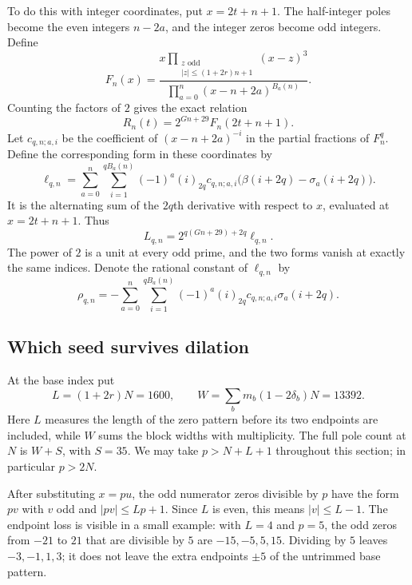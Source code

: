 \documentclass[11pt]{article}
\begin{document}
To do this with integer coordinates, put $x=2t+n+1$. The half-integer
poles become the even integers $n-2a$, and the integer zeros become odd
integers. Define
\begin{equation}\label{eq:F}
 F_n(x)=\frac{x\prod_{\substack{z\text{ odd}\\|z|\le(1+2r)n+1}}(x-z)^3}
 {\prod_{a=0}^n(x-n+2a)^{B_a(n)}}.
\end{equation}
Counting the factors of $2$ gives the exact relation
\begin{equation}\label{eq:change}
 R_n(t)=2^{Gn+29}F_n(2t+n+1).
\end{equation}
Let $c_{q,n;a,i}$ be the coefficient of $(x-n+2a)^{-i}$ in the partial
fractions of $F_n^q$. Define the corresponding form in these coordinates by
\[
 \ell_{q,n}=\sum_{a=0}^n\sum_{i=1}^{qB_a(n)}(-1)^a(i)_{2q}c_{q,n;a,i}
                      \bigl(\beta(i+2q)-\sigma_a(i+2q)\bigr).
\]
It is the alternating sum of the $2q$th derivative with respect to $x$,
evaluated at $x=2t+n+1$. Thus
\begin{equation}\label{eq:ellL}
 L_{q,n}=2^{q(Gn+29)+2q}\ell_{q,n}.
\end{equation}
The power of $2$ is a unit at every odd prime, and the two forms vanish
at exactly the same indices. Denote the rational constant of $\ell_{q,n}$ by
\begin{equation}\label{eq:rho}
 \rho_{q,n}=-\sum_{a=0}^n\sum_{i=1}^{qB_a(n)}
                   (-1)^a(i)_{2q}c_{q,n;a,i}\sigma_a(i+2q).
\end{equation}

\subsection{Which seed survives dilation}
At the base index put
\[
 L=(1+2r)N=1600,\qquad
 W=\sum_bm_b(1-2\delta_b)N=13392.
\]
Here $L$ measures the length of the zero pattern before its two endpoints
are included, while $W$ sums the block widths with multiplicity.
The full pole count at $N$ is $W+S$, with $S=35$.
We may take $p>N+L+1$ throughout this section; in particular $p>2N$.

After substituting $x=pu$, the odd numerator zeros divisible by $p$ have
the form $pv$ with $v$ odd and $|pv|\le Lp+1$. Since $L$ is even, this
means $|v|\le L-1$. The endpoint loss is visible in a small example:
with $L=4$ and $p=5$, the odd zeros from $-21$ to $21$ that are divisible
by $5$ are $-15,-5,5,15$. Dividing by $5$ leaves $-3,-1,1,3$; it does
not leave the extra endpoints $\pm5$ of the untrimmed base pattern.
\end{document}
